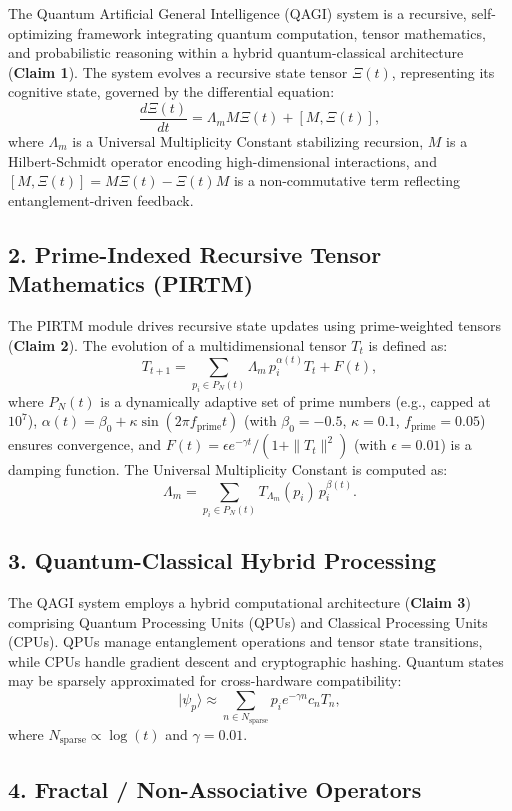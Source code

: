 \documentclass{article}
\theoremstyle{plain}
\theoremstyle{claimstyle}
\begin{document}
The Quantum Artificial General Intelligence (QAGI) system is a recursive, self-optimizing framework integrating quantum computation, tensor mathematics, and probabilistic reasoning within a hybrid quantum-classical architecture (\textbf{Claim 1}). The system evolves a recursive state tensor \(\Xi(t)\), representing its cognitive state, governed by the differential equation:
\[
\frac{d\Xi(t)}{dt} = \Lambda_m M \Xi(t) + [M, \Xi(t)],
\]
where \(\Lambda_m\) is a Universal Multiplicity Constant stabilizing recursion, \(M\) is a Hilbert-Schmidt operator encoding high-dimensional interactions, and \([M, \Xi(t)] = M\Xi(t) - \Xi(t)M\) is a non-commutative term reflecting entanglement-driven feedback.

\subsection*{2. Prime-Indexed Recursive Tensor Mathematics (PIRTM)}

The PIRTM module drives recursive state updates using prime-weighted tensors (\textbf{Claim 2}). The evolution of a multidimensional tensor \(T_t\) is defined as:
\[
T_{t+1} = \sum_{p_i \in P_N(t)} \Lambda_m \, p_i^{\alpha(t)} T_t + F(t),
\]
where \(P_N(t)\) is a dynamically adaptive set of prime numbers (e.g., capped at \(10^7\)), \(\alpha(t) = \beta_0 + \kappa \sin(2\pi f_{\text{prime}} t)\) (with \(\beta_0 = -0.5\), \(\kappa = 0.1\), \(f_{\text{prime}} = 0.05\)) ensures convergence, and \(F(t) = \epsilon e^{-\gamma t} / (1 + \|T_t\|^2)\) (with \(\epsilon = 0.01\)) is a damping function. The Universal Multiplicity Constant is computed as:
\[
\Lambda_m = \sum_{p_i \in P_N(t)} T_{\Lambda_m}(p_i) \, p_i^{\beta(t)}.
\]

\subsection*{3. Quantum-Classical Hybrid Processing}

The QAGI system employs a hybrid computational architecture (\textbf{Claim 3}) comprising Quantum Processing Units (QPUs) and Classical Processing Units (CPUs). QPUs manage entanglement operations and tensor state transitions, while CPUs handle gradient descent and cryptographic hashing. Quantum states may be sparsely approximated for cross-hardware compatibility:
\[
|\psi_p\rangle \approx \sum_{n \in N_{\text{sparse}}} p_i e^{-\gamma n} c_n T_n,
\]
where \(N_{\text{sparse}} \propto \log(t)\) and \(\gamma = 0.01\).

\subsection*{4. Fractal / Non-Associative Operators}
\end{document}

